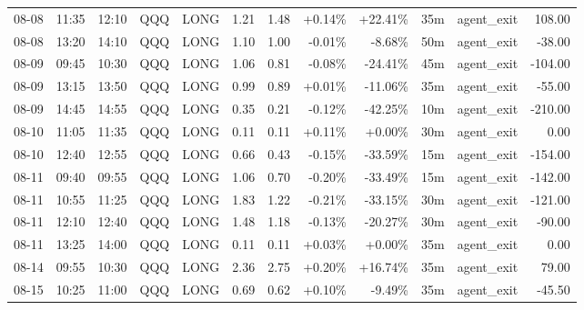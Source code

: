 \documentclass[11pt,a4paper,twoside]{article}
\begin{document}
\begin{center}
\begin{longtable}{>{\color{txtmain}}l l l l l r r r r r >{\color{txtmain}}l r}
08-08 & 11:35 & 12:10 & QQQ & LONG & 1.21 & 1.48 & \textcolor{wingreen}{+0.14\%} & \textcolor{wingreen}{+22.41\%} & 35m & agent\_exit & \textcolor{wingreen}{108.00} \\
08-08 & 13:20 & 14:10 & QQQ & LONG & 1.10 & 1.00 & \textcolor{lossred}{-0.01\%} & \textcolor{lossred}{-8.68\%} & 50m & agent\_exit & \textcolor{lossred}{-38.00} \\
08-09 & 09:45 & 10:30 & QQQ & LONG & 1.06 & 0.81 & \textcolor{lossred}{-0.08\%} & \textcolor{lossred}{-24.41\%} & 45m & agent\_exit & \textcolor{lossred}{-104.00} \\
08-09 & 13:15 & 13:50 & QQQ & LONG & 0.99 & 0.89 & \textcolor{wingreen}{+0.01\%} & \textcolor{lossred}{-11.06\%} & 35m & agent\_exit & \textcolor{lossred}{-55.00} \\
08-09 & 14:45 & 14:55 & QQQ & LONG & 0.35 & 0.21 & \textcolor{lossred}{-0.12\%} & \textcolor{lossred}{-42.25\%} & 10m & agent\_exit & \textcolor{lossred}{-210.00} \\
08-10 & 11:05 & 11:35 & QQQ & LONG & 0.11 & 0.11 & \textcolor{wingreen}{+0.11\%} & \textcolor{wingreen}{+0.00\%} & 30m & agent\_exit & \textcolor{wingreen}{0.00} \\
08-10 & 12:40 & 12:55 & QQQ & LONG & 0.66 & 0.43 & \textcolor{lossred}{-0.15\%} & \textcolor{lossred}{-33.59\%} & 15m & agent\_exit & \textcolor{lossred}{-154.00} \\
08-11 & 09:40 & 09:55 & QQQ & LONG & 1.06 & 0.70 & \textcolor{lossred}{-0.20\%} & \textcolor{lossred}{-33.49\%} & 15m & agent\_exit & \textcolor{lossred}{-142.00} \\
08-11 & 10:55 & 11:25 & QQQ & LONG & 1.83 & 1.22 & \textcolor{lossred}{-0.21\%} & \textcolor{lossred}{-33.15\%} & 30m & agent\_exit & \textcolor{lossred}{-121.00} \\
08-11 & 12:10 & 12:40 & QQQ & LONG & 1.48 & 1.18 & \textcolor{lossred}{-0.13\%} & \textcolor{lossred}{-20.27\%} & 30m & agent\_exit & \textcolor{lossred}{-90.00} \\
08-11 & 13:25 & 14:00 & QQQ & LONG & 0.11 & 0.11 & \textcolor{wingreen}{+0.03\%} & \textcolor{wingreen}{+0.00\%} & 35m & agent\_exit & \textcolor{wingreen}{0.00} \\
08-14 & 09:55 & 10:30 & QQQ & LONG & 2.36 & 2.75 & \textcolor{wingreen}{+0.20\%} & \textcolor{wingreen}{+16.74\%} & 35m & agent\_exit & \textcolor{wingreen}{79.00} \\
08-15 & 10:25 & 11:00 & QQQ & LONG & 0.69 & 0.62 & \textcolor{wingreen}{+0.10\%} & \textcolor{lossred}{-9.49\%} & 35m & agent\_exit & \textcolor{lossred}{-45.50} \\

\end{longtable}
\end{center}
\end{document}
